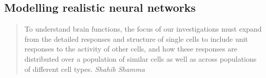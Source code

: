 \subsection{Modelling realistic neural networks}\label{Ch1:ModellingIntro}

\begin{quote}
  To understand brain functions, the focus of our investigations must
  expand from the detailed responses and structure of single cells to
  include unit responses to the activity of other cells, and how these
  responses are distributed over a population of similar cells as well
  as across populations of different cell types.  \it{Shahib Shamma}
\end{quote}



















